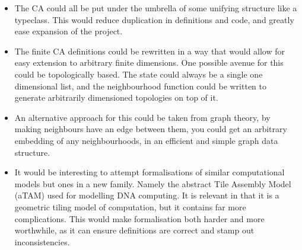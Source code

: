 \begin{itemize}
    \item The CA could all be put under the umbrella of some unifying structure like a typeclass.
        This would reduce duplication in definitions and code,
        and greatly ease expansion of the project.
    \item The finite CA definitions could be rewritten in a way that would allow for easy extension to arbitrary finite dimensions.
        One possible avenue for this could be topologically based.
        The state could always be a single one dimensional list,
        and the neighbourhood function could be written to generate arbitrarily dimensioned topologies on top of it.
    \item An alternative approach for this could be taken from graph theory, 
        by making neighbours have an edge between them,
        you could get an arbitrary embedding of any neighbourhoods,
        in an efficient and simple graph data structure.
    \item It would be interesting to attempt formalisations of similar computational models but ones in a new family.
        Namely the abstract Tile Assembly Model (aTAM) \cite{doty} used for modelling DNA computing.
        It is relevant in that it is a geometric tiling model of computation,
        but it contains far more complications.
        This would make formalisation both harder and more worthwhile,
        as it can ensure definitions are correct and stamp out inconsistencies.
\end{itemize}

